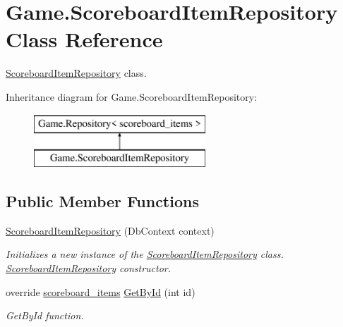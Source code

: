 \hypertarget{class_game_1_1_scoreboard_item_repository}{}\section{Game.\+Scoreboard\+Item\+Repository Class Reference}
\label{class_game_1_1_scoreboard_item_repository}


\mbox{\hyperlink{class_game_1_1_scoreboard_item_repository}{Scoreboard\+Item\+Repository}} class.  


Inheritance diagram for Game.\+Scoreboard\+Item\+Repository\+:\begin{figure}[H]
\begin{center}
\leavevmode
\includegraphics[height=2.000000cm]{class_game_1_1_scoreboard_item_repository}
\end{center}
\end{figure}
\subsection*{Public Member Functions}
\begin{DoxyCompactItemize}
\item 
\mbox{\hyperlink{class_game_1_1_scoreboard_item_repository_a3c85955beb8e4c1cd6bde69e712e583b}{Scoreboard\+Item\+Repository}} (Db\+Context context)
\begin{DoxyCompactList}\small\item\em Initializes a new instance of the \mbox{\hyperlink{class_game_1_1_scoreboard_item_repository}{Scoreboard\+Item\+Repository}} class. \mbox{\hyperlink{class_game_1_1_scoreboard_item_repository}{Scoreboard\+Item\+Repository}} constructor. \end{DoxyCompactList}\item 
override \mbox{\hyperlink{class_game_1_1_data_1_1scoreboard__items}{scoreboard\+\_\+items}} \mbox{\hyperlink{class_game_1_1_scoreboard_item_repository_acd35ca45dedeb7e13634a08185f704e8}{Get\+By\+Id}} (int id)
\begin{DoxyCompactList}\small\item\em Get\+By\+Id function. \end{DoxyCompactList}\end{DoxyCompactItemize}
